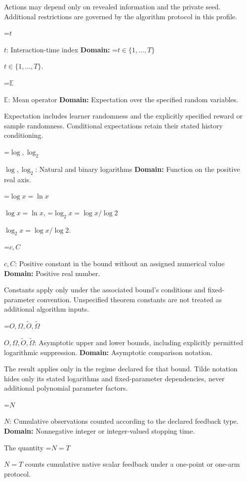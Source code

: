 \documentclass[10pt,a4paper]{article}
\newcommand{\AtlasMath}[1]{\par\begingroup\centering\setbox0=\hbox{$\displaystyle #1$}\ifdim\wd0>1.4\linewidth\typeout{ATLAS WIDE FORMULA: \the\wd0}\fi\ifdim\wd0>\linewidth\resizebox{\linewidth}{!}{\box0}\else\box0\fi\par\endgroup}
\newcommand{\AtlasInlineMath}[1]{\begingroup\setbox0=\hbox{$#1$}\ifdim\wd0>.4\linewidth\endgroup\AtlasMath{#1}\else\endgroup$#1$\fi}
\begin{document}
Actions may depend only on revealed information and the private seed. Additional restrictions are governed by the algorithm protocol in this profile.



\AtlasInlineMath{t}: Interaction-time index \textbf{Domain:} \AtlasInlineMath{t\in\{1,\ldots,T\}}.



\AtlasInlineMath{\mathbb E}: Mean operator \textbf{Domain:} Expectation over the specified random variables.



Expectation includes learner randomness and the explicitly specified reward or sample randomness. Conditional expectations retain their stated history conditioning.



\AtlasInlineMath{\log,\log_2}: Natural and binary logarithms \textbf{Domain:} Function on the positive real axis.



\AtlasInlineMath{\log x=\ln x}, \AtlasInlineMath{\log_2x=\log x/\log2}.



\AtlasInlineMath{c,C}: Positive constant in the bound without an assigned numerical value \textbf{Domain:} Positive real number.



Constants apply only under the associated bound’s conditions and fixed-parameter convention. Unspecified theorem constants are not treated as additional algorithm inputs.



\AtlasInlineMath{O,\Omega,\widetilde O,\widetilde\Omega}: Asymptotic upper and lower bounds, including explicitly permitted logarithmic suppression. \textbf{Domain:} Asymptotic comparison notation.



The result applies only in the regime declared for that bound. Tilde notation hides only its stated logarithms and fixed-parameter dependencies, never additional polynomial parameter factors.



\AtlasInlineMath{N}: Cumulative observations counted according to the declared feedback type. \textbf{Domain:} Nonnegative integer or integer-valued stopping time.



The quantity \AtlasInlineMath{N=T} counts cumulative native scalar feedback under a one-point or one-arm protocol.
\end{document}
